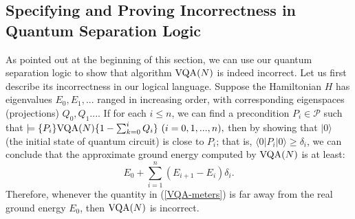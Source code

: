 \documentclass[conference,compsoc, 10pt]{IEEEtran}
\newcommand {\cP } {{\mathcal{P}}}
\def\>{\ensuremath{\rangle}}
\def\<{\ensuremath{\langle}}
\begin{document}
	\subsection{Specifying and Proving Incorrectness in Quantum Separation Logic}
	\label{sec: VQA in QSL}
	As pointed out at the beginning of this section, we can use our quantum separation logic to show that algorithm ${\rm VQA}(N)$ is indeed incorrect. Let us first describe its incorrectness in our logical language.  
	Suppose the Hamiltonian $H$ has eigenvalues $E_0,E_1,...$ ranged in increasing order, with corresponding eigenspaces (projections) $Q_0, Q_1...$. 
	If for each $i\leq n$, we can find a  precondition $P_i\in\cP$ such that $\models\{P_i\} {\rm VQA}(N) \{1-\sum_{k=0}^{i}Q_i\}\ (i=0,1,...,n),$ then by showing that $|0\>$ (the initial state of quantum circuit) is close to $P_i$; that is, $\<0|P_i|0\> \ge \delta_i$, we can conclude that the approximate ground energy computed by ${\rm VQA}(N)$ is at least: 
	\begin{equation}\label{VQA-meters}E_0 + \sum_{i=1}^{n}(E_{i+1}-E_{i})\delta_i.\end{equation}
	Therefore, whenever the quantity in (\ref{VQA-meters}) is far away from the real ground energy $E_0$, then ${\rm VQA}(N)$ is incorrect.
	
	
\end{document}
